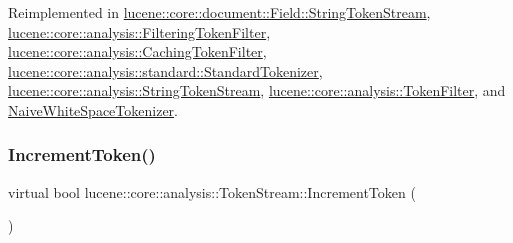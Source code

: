 Reimplemented in \mbox{\hyperlink{classlucene_1_1core_1_1document_1_1Field_1_1StringTokenStream_acbadfa77de855b030af35f1206231525}{lucene\+::core\+::document\+::\+Field\+::\+String\+Token\+Stream}}, \mbox{\hyperlink{classlucene_1_1core_1_1analysis_1_1FilteringTokenFilter_adf6b7aac9634afdffe1800a369753688}{lucene\+::core\+::analysis\+::\+Filtering\+Token\+Filter}}, \mbox{\hyperlink{classlucene_1_1core_1_1analysis_1_1CachingTokenFilter_a7241be5e51e730f4e311572510de147e}{lucene\+::core\+::analysis\+::\+Caching\+Token\+Filter}}, \mbox{\hyperlink{classlucene_1_1core_1_1analysis_1_1standard_1_1StandardTokenizer_a733b678af865ff10e41fba9b74131872}{lucene\+::core\+::analysis\+::standard\+::\+Standard\+Tokenizer}}, \mbox{\hyperlink{classlucene_1_1core_1_1analysis_1_1StringTokenStream_aabf9a873c934aff5c359417488f33849}{lucene\+::core\+::analysis\+::\+String\+Token\+Stream}}, \mbox{\hyperlink{classlucene_1_1core_1_1analysis_1_1TokenFilter_ad2e29dd32aa4df385d0f290f10f20721}{lucene\+::core\+::analysis\+::\+Token\+Filter}}, and \mbox{\hyperlink{classNaiveWhiteSpaceTokenizer_a4c4f4debc08aa3e05b07b782144b5ae6}{Naive\+White\+Space\+Tokenizer}}.

\mbox{\label{classlucene_1_1core_1_1analysis_1_1TokenStream_a614d4ea24a354d6f4354b4941b5124e2}} 
\subsubsection{\texorpdfstring{Increment\+Token()}{IncrementToken()}}
{\footnotesize\ttfamily virtual bool lucene\+::core\+::analysis\+::\+Token\+Stream\+::\+Increment\+Token (\begin{DoxyParamCaption}{ }\end{DoxyParamCaption})\hspace{0.3cm}{\ttfamily [pure virtual]}}



